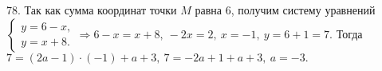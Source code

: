 78. Так как сумма координат точки $M$ равна 6, получим систему уравнений $\begin{cases} y=6-x,\\ y=x+8.\end{cases}\Rightarrow 6-x=x+8,\ -2x=2,\ x=-1,\ y=6+1=7.$ Тогда $7=(2a-1)\cdot(-1)+a+3,\ 7=-2a+1+a+3,\ a=-3.$\\
